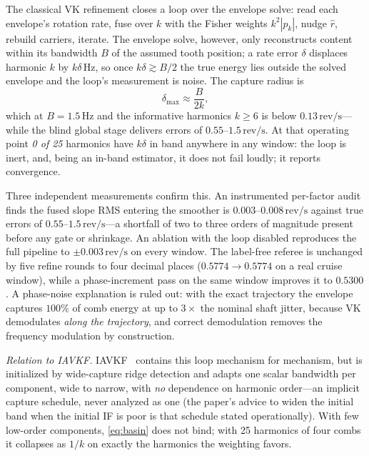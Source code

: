 \documentclass[journal]{IEEEtran}
\newcommand{\revps}{\ensuremath{\,\mathrm{rev/s}}}
\begin{document}
The classical VK refinement closes a loop over the envelope solve: read
each envelope's rotation rate, fuse over $k$ with the Fisher weights
$k^2|p_k|$, nudge $\hat r$, rebuild carriers, iterate. The envelope
solve, however, only reconstructs content within its bandwidth $B$ of the
assumed tooth position; a rate error $\delta$ displaces harmonic $k$ by
$k\delta$\,Hz, so once $k\delta \gtrsim B/2$ the true energy lies outside
the solved envelope and the loop's measurement is noise. The capture
radius is
\begin{equation}
  \delta_{\max} \approx \frac{B}{2k},
  \label{eq:basin}
\end{equation}
which at $B = 1.5$\,Hz and the informative harmonics $k \ge 6$ is below
$0.13\revps$---while the blind global stage delivers errors of
$0.55$--$1.5\revps$. At that operating point \emph{0 of 25} harmonics
have $k\delta$ in band anywhere in any window: the loop is inert, and,
being an in-band estimator, it does not fail loudly; it reports
convergence.

Three independent measurements confirm this. An instrumented per-factor
audit finds the fused slope RMS entering the smoother is
$0.003$--$0.008\revps$ against true errors of $0.55$--$1.5\revps$---a
shortfall of two to three orders of magnitude present before any gate or
shrinkage. An ablation with the loop disabled reproduces the full
pipeline to $\pm0.003\revps$ on every window. The label-free referee is
unchanged by five refine rounds to four decimal places ($0.5774 \to
0.5774$ on a real cruise window), while a phase-increment pass on the
same window improves it to $0.5300$. A phase-noise explanation is ruled
out: with the exact trajectory the envelope captures $100\%$ of comb
energy at up to $3\times$ the nominal shaft jitter, because VK
demodulates \emph{along the trajectory}, and correct demodulation removes
the frequency modulation by construction.

\emph{Relation to IAVKF.} IAVKF~\cite{jiang2024iavkf} contains this loop
mechanism for mechanism, but is initialized by wide-capture ridge
detection and adapts one scalar bandwidth per component, wide to narrow,
with \emph{no} dependence on harmonic order---an implicit capture
schedule, never analyzed as one (the paper's advice to widen the initial
band when the initial IF is poor is that schedule stated operationally).
With few low-order components, \eqref{eq:basin} does not bind; with 25
harmonics of four combs it collapses as $1/k$ on exactly the harmonics
the weighting favors.
\end{document}

